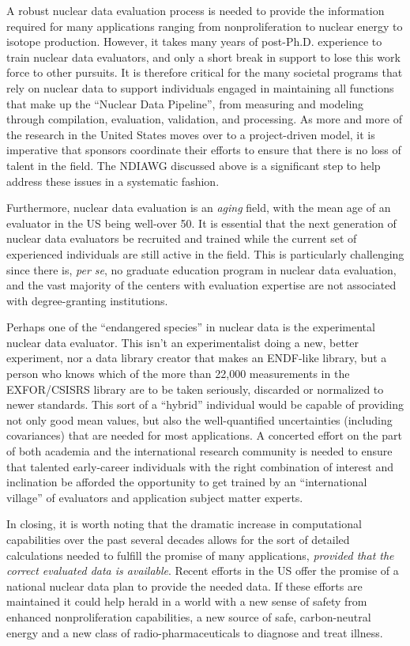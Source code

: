 \documentclass[letterpaper]{ar-1col}
\begin{document}
A robust nuclear data evaluation process is needed to provide the information required for many applications ranging from nonproliferation to nuclear energy to isotope production.  However, it takes many years of post-Ph.D. experience to train nuclear data evaluators, and only a short break in support to lose  this work force to other pursuits.  It is therefore critical for the many societal programs that rely on nuclear data to support individuals engaged in maintaining all functions that make up the \enquote{Nuclear Data Pipeline}, from measuring and modeling through compilation, evaluation, validation, and processing.  As more and more of the research in the United States moves over to a project-driven model, it is imperative that sponsors coordinate their efforts to ensure that there is no loss of talent in the field.  The NDIAWG discussed above is a significant step to help address these issues in a systematic fashion.

Furthermore, nuclear data evaluation is an \emph{aging} field, with the mean age of an evaluator in the US being well-over 50.  It is essential that the next generation of nuclear data evaluators be recruited and trained while the current set of experienced individuals are still active in the field.  This is particularly challenging since there is, \emph{per se}, no graduate education program in nuclear data evaluation, and the vast majority of the centers with evaluation expertise are not associated with degree-granting institutions.  

Perhaps one of the \enquote{endangered species} in nuclear data is the experimental nuclear data evaluator.  This isn't an experimentalist doing a new, better experiment, nor a data library creator that makes an ENDF-like library, but a person who knows which of the more than 22,000 measurements in the EXFOR/CSISRS library are to be taken seriously, discarded or normalized to newer standards.  This sort of a \enquote{hybrid} individual would be capable of providing not only good mean values, but also the well-quantified uncertainties (including covariances) that are needed for most applications.  A concerted effort on the part of both academia and the international research community is needed to ensure that talented early-career individuals with the right combination of interest and inclination be afforded the opportunity to get trained by an \enquote{international village} of evaluators and application subject matter experts.  

In closing, it is worth noting that the dramatic increase in computational capabilities over the past several decades allows for the sort of detailed calculations needed to fulfill the promise of many applications, \emph{provided that the correct evaluated data is available}.   Recent efforts in the US offer the promise of a national nuclear data plan to provide the needed data.  If these efforts are maintained it could help herald in a world with a new sense of safety from enhanced nonproliferation capabilities, a new source of safe, carbon-neutral energy and a new class of radio-pharmaceuticals to diagnose and treat illness.  
\end{document}
